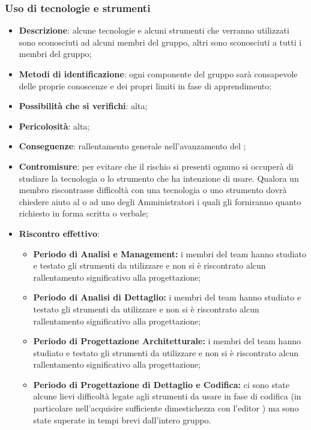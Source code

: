 		\subsubsection{Uso di tecnologie e strumenti}
			\begin{itemize}
				\item \textbf{Descrizione}: alcune tecnologie e alcuni strumenti che verranno utilizzati sono sconosciuti ad alcuni membri del gruppo, altri sono sconosciuti a tutti i membri del gruppo;
				\item \textbf{Metodi di identificazione}: ogni componente del gruppo sarà consapevole delle proprie conoscenze e dei propri limiti in fase di apprendimento;
				\item \textbf{Possibilità che si verifichi}: alta;
				\item \textbf{Pericolosità}: alta;
				\item \textbf{Conseguenze}: rallentamento generale nell'avanzamento del ;
				\item \textbf{Contromisure}:  per evitare che il rischio si presenti ognuno si occuperà di studiare la tecnologia o lo strumento che ha intenzione di usare. Qualora un membro riscontrasse difficoltà con una tecnologia o uno strumento dovrà chiedere aiuto al \RES{} o ad uno degli Amministratori i quali gli forniranno quanto richiesto in forma scritta o verbale;
				\item \textbf{Riscontro effettivo}:
				\begin{itemize}
					\item \textbf{Periodo di Analisi e Management:} i membri del team hanno studiato e testato gli strumenti da utilizzare e non si è riscontrato alcun rallentamento significativo alla progettazione;
					\item \textbf{Periodo di Analisi di Dettaglio:} i membri del team hanno studiato e testato gli strumenti da utilizzare e non si è riscontrato alcun rallentamento significativo alla progettazione;
					\item \textbf{Periodo di Progettazione Architetturale:} i membri del team hanno studiato e testato gli strumenti da utilizzare e non si è riscontrato alcun rallentamento significativo alla progettazione;
               \item \textbf{Periodo di Progettazione di Dettaglio e Codifica:} ci sono state alcune lievi difficoltà legate agli strumenti da usare in fase di codifica (in particolare nell'acquisire sufficiente dimestichezza con l'editor ) ma sono state superate in tempi brevi dall'intero gruppo.
				\end{itemize}
			\end{itemize}

